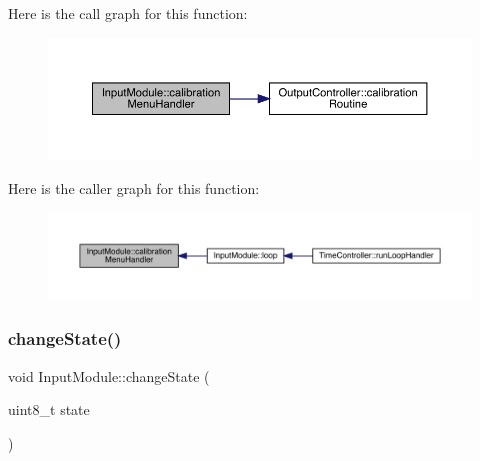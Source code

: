 Here is the call graph for this function\+:
\nopagebreak
\begin{figure}[H]
\begin{center}
\leavevmode
\includegraphics[width=350pt]{class_input_module_a75dd14eb87936e206ba74ca406851201_cgraph}
\end{center}
\end{figure}
Here is the caller graph for this function\+:
\nopagebreak
\begin{figure}[H]
\begin{center}
\leavevmode
\includegraphics[width=350pt]{class_input_module_a75dd14eb87936e206ba74ca406851201_icgraph}
\end{center}
\end{figure}
\mbox{\label{class_input_module_ac6242c4331441ba020d2fca7bff7a401}} 
\subsubsection{\texorpdfstring{change\+State()}{changeState()}}
{\footnotesize\ttfamily void Input\+Module\+::change\+State (\begin{DoxyParamCaption}\item[{uint8\+\_\+t}]{state }\end{DoxyParamCaption})}

